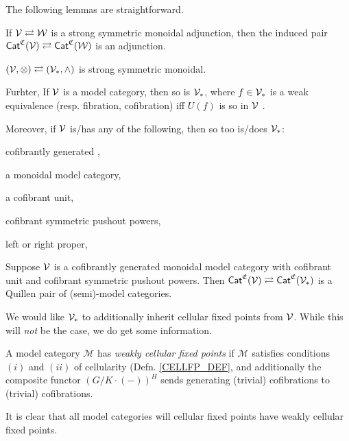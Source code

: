 \documentclass[a4paper,10pt
,draft
]{article}%
\renewcommand{\1}{\eta}%
\begin{document}
The following lemmas are straightforward.

\begin{lemma}
      If $\mathcal V \rightleftarrows \mathcal W$ is a strong symmetric monoidal adjunction, then
      the induced pair $\mathsf{Cat}^{\mathfrak C}(\mathcal V) \rightleftarrows \mathsf{Cat}^{\mathfrak C}(\mathcal W)$ is an adjunction.
\end{lemma}

\begin{lemma}
      \label{PT_PROP_LEM}
      $(\V,\otimes) \rightleftarrows (\V_{\**}, \wedge)$ is strong symmetric monoidal.

      Furhter, If $\mathcal V$ is a model category, then so is $\V_{\**}$, where $f \in \V_{\**}$ is a weak equivalence (resp. fibration, cofibration) iff
      $U(f)$ is so in $\mathcal V$ \cite[Lemma 1.1.8]{Hov99}. 

      Moreover, if $\mathcal V$ is/has any of the following, then so too is/does $\V_{\**}$:
      \begin{enumerate*}[label = (\roman*)]
      \item cofibrantly generated \cite[Lemma 2.1.21]{Hov99},
      \item a monoidal model category,
      \item a cofibrant unit,
      \item cofibrant symmetric pushout powers,
      \item left or right proper,
      \end{enumerate*}
\end{lemma}

\begin{lemma}
      Suppose $\mathcal V$ is a cofibrantly generated monoidal model category with cofibrant unit and cofibrant symmetric pushout powers.
      Then
      $\Cat^{\mathfrak C}(\V) \rightleftarrows \Cat^{\mathfrak C}(\V_{\**})$ is a Quillen pair of (semi)-model categories.
\end{lemma}

We would like $\V_{\**}$ to additionally inherit cellular fixed points from $\mathcal V$.
While this will \textit{not} be the case, we do get some information.
\begin{definition}
      A model category $\mathcal M$ has \textit{weakly cellular fixed points} if
      $\mathcal M$ satisfies conditions $(i)$ and $(ii)$ of cellularity (Defn. \ref{CELLFP_DEF},
      and additionally the composite functor $(G/K \cdot (-))^H$ sends generating (trivial) cofibrations to (trivial) cofibrations.

      It is clear that all model categories will cellular fixed points have weakly cellular fixed points.
\end{definition}
\end{document}
